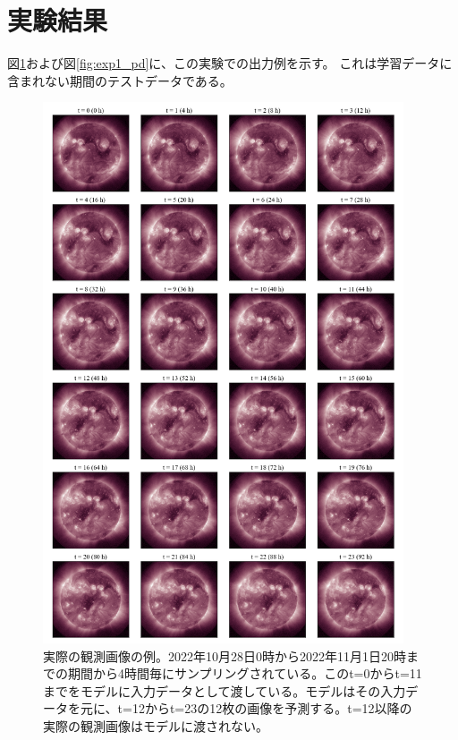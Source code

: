   \section{実験結果}
    図\ref{fig:exp1_gt}および図\ref{fig:exp1_pd}に、この実験での出力例を示す。
    これは学習データに含まれない期間のテストデータである。
    \begin{figure}[htbp]
      \centering
      \includegraphics[width=0.95\textwidth]{figures/exp1/gt.png}
      \caption{実際の観測画像の例。2022年10月28日0時から2022年11月1日20時までの期間から4時間毎にサンプリングされている。このt=0からt=11までをモデルに入力データとして渡している。モデルはその入力データを元に、t=12からt=23の12枚の画像を予測する。t=12以降の実際の観測画像はモデルに渡されない。}
      \label{fig:exp1_gt}
    \end{figure}
